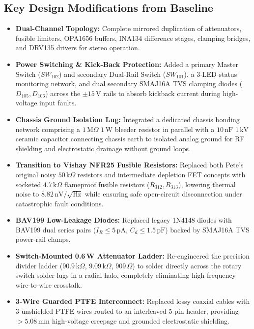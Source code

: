 \documentclass[11pt, letterpaper]{article}
\begin{document}
\subsection{Key Design Modifications from Baseline}
\begin{itemize}[leftmargin=1.5em]
    \item \textbf{Dual-Channel Topology:} Complete mirrored duplication of attenuators, fusible limiters, OPA1656 buffers, INA134 difference stages, clamping bridges, and DRV135 drivers for stereo operation.
    \item \textbf{Power Switching \& Kick-Back Protection:} Added a primary Master Switch ($SW_{102}$) and secondary Dual-Rail Switch ($SW_{101}$), a 3-LED status monitoring network, and dual secondary SMAJ16A TVS clamping diodes ($D_{105}, D_{106}$) across the $\pm 15\,\text{V}$ rails to absorb kickback current during high-voltage input faults.
    \item \textbf{Chassis Ground Isolation Lug:} Integrated a dedicated chassis bonding network comprising a $1\,\text{M}\Omega$ $1\,\text{W}$ bleeder resistor in parallel with a $10\,\text{nF}$ $1\,\text{kV}$ ceramic capacitor connecting chassis earth to isolated analog ground for RF shielding and electrostatic drainage without ground loops.
    \item \textbf{Transition to Vishay NFR25 Fusible Resistors:} Replaced both Pete's original noisy $50\,\text{k}\Omega$ resistors and intermediate depletion FET concepts with socketed $4.7\,\text{k}\Omega$ flameproof fusible resistors ($R_{312}, R_{313}$), lowering thermal noise to $8.82\,\text{nV}/\sqrt{\text{Hz}}$ while ensuring safe open-circuit disconnection under catastrophic fault conditions.
    \item \textbf{BAV199 Low-Leakage Diodes:} Replaced legacy 1N4148 diodes with BAV199 dual series pairs ($I_R \le 5\,\text{pA}$, $C_d \le 1.5\,\text{pF}$) backed by SMAJ16A TVS power-rail clamps.
    \item \textbf{Switch-Mounted 0.6\,W Attenuator Ladder:} Re-engineered the precision divider ladder ($90.9\,\text{k}\Omega$, $9.09\,\text{k}\Omega$, $909\,\Omega$) to solder directly across the rotary switch solder lugs in a radial halo, completely eliminating high-frequency wire-to-wire crosstalk.
    \item \textbf{3-Wire Guarded PTFE Interconnect:} Replaced lossy coaxial cables with 3 unshielded PTFE wires routed to an interleaved 5-pin header, providing $>5.08\,\text{mm}$ high-voltage creepage and grounded electrostatic shielding.

\end{itemize}
\end{document}
